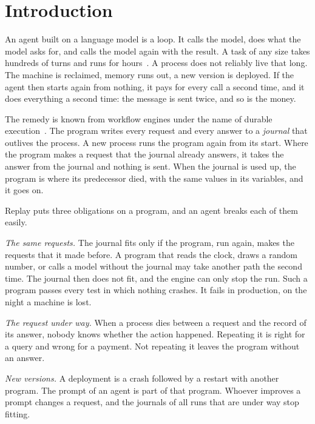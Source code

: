 \documentclass[acmsmall,nonacm,screen]{acmart}
\begin{document}
\maketitle

\section{Introduction}

An agent built on a language model is a loop. It calls the model, does what the model asks
for, and calls the model again with the result. A task of any size takes hundreds of turns
and runs for hours~\citep{tpp6}. A process does not reliably live that long. The machine is
reclaimed, memory runs out, a new version is deployed. If the agent then starts again from
nothing, it pays for every call a second time, and it does everything a second time: the
message is sent twice, and so is the money.

The remedy is known from workflow engines under the name of durable
execution~\citep{burckhardt2021,temporal-workflow}. The program writes every request and
every answer to a \emph{journal} that outlives the process. A new process runs the program
again from its start. Where the program makes a request that the journal already answers, it
takes the answer from the journal and nothing is sent. When the journal is used up, the
program is where its predecessor died, with the same values in its variables, and it goes on.

Replay puts three obligations on a program, and an agent breaks each of them easily.

\emph{The same requests.} The journal fits only if the program, run again, makes the requests
that it made before. A program that reads the clock, draws a random number, or calls a model
without the journal may take another path the second time. The journal then does not fit, and
the engine can only stop the run. Such a program passes every test in which nothing crashes.
It fails in production, on the night a machine is lost.

\emph{The request under way.} When a process dies between a request and the record of its
answer, nobody knows whether the action happened. Repeating it is right for a query and wrong
for a payment. Not repeating it leaves the program without an answer.

\emph{New versions.} A deployment is a crash followed by a restart with another program. The
prompt of an agent is part of that program. Whoever improves a prompt changes a request, and
the journals of all runs that are under way stop fitting.
\end{document}
